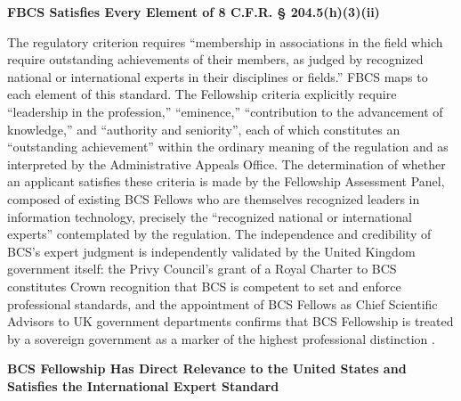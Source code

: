 \textbf{FBCS Satisfies Every Element of 8 C.F.R. § 204.5(h)(3)(ii)}

The regulatory criterion requires ``membership in associations in the field which require outstanding achievements of their members, as judged by recognized national or international experts in their disciplines or fields.'' FBCS maps to each element of this standard. The Fellowship criteria explicitly require ``leadership in the profession,'' ``eminence,'' ``contribution to the advancement of knowledge,'' and ``authority and seniority'', each of which constitutes an ``outstanding achievement'' within the ordinary meaning of the regulation and as interpreted by the Administrative Appeals Office. The determination of whether an applicant satisfies these criteria is made by the Fellowship Assessment Panel, composed of existing BCS Fellows who are themselves recognized leaders in information technology, precisely the ``recognized national or international experts'' contemplated by the regulation. The independence and credibility of BCS's expert judgment is independently validated by the United Kingdom government itself: the Privy Council's grant of a Royal Charter to BCS constitutes Crown recognition that BCS is competent to set and enforce professional standards, and the appointment of BCS Fellows as Chief Scientific Advisors to UK government departments confirms that BCS Fellowship is treated by a sovereign government as a marker of the highest professional distinction \cite{bcsroyalcharter, bcsannualreport}.

\textbf{BCS Fellowship Has Direct Relevance to the United States and Satisfies the International Expert Standard}


